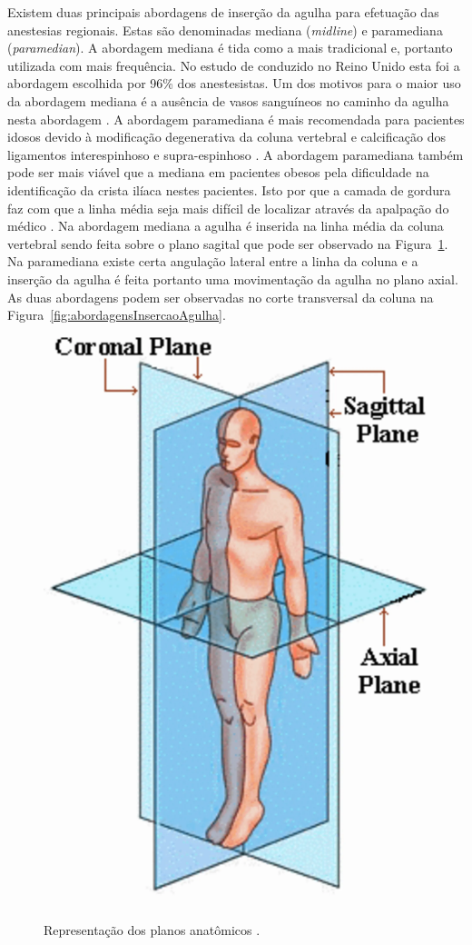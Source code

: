 Existem duas principais abordagens de inserção da agulha para efetuação das anestesias regionais. Estas são denominadas mediana (\textit{midline}) e paramediana (\textit{paramedian}). A abordagem mediana é tida como a mais tradicional e, portanto  utilizada com mais frequência. No estudo de \textcite{Wantman2006} conduzido no Reino Unido esta foi a abordagem escolhida por 96\% dos anestesistas. Um dos motivos para o maior uso da abordagem mediana é a ausência de vasos sanguíneos no caminho da agulha nesta abordagem \cite{Bapat2015}. A abordagem paramediana é mais recomendada para pacientes idosos \cite{Ahsan-ul-Haq2005} devido à modificação degenerativa da coluna vertebral \cite{Boon2003} e calcificação dos ligamentos interespinhoso e supra-espinhoso \cite{Wantman2006}. A abordagem paramediana também pode ser mais viável que a mediana em pacientes obesos pela dificuldade na identificação da crista ilíaca nestes pacientes. Isto por que a camada de gordura faz com que a linha média seja mais difícil de localizar através da apalpação do médico \cite{N.2013}. Na abordagem mediana a agulha é inserida na linha média da coluna vertebral sendo feita sobre o plano sagital que pode ser observado na Figura~\ref{fig:planosAnatomicos}. Na paramediana existe certa angulação lateral entre a linha da coluna e a inserção da agulha é feita portanto uma movimentação da agulha no plano axial. As duas abordagens podem ser observadas no corte transversal da coluna na Figura~\ref{fig:abordagensInsercaoAgulha}. 

\begin{figure}[ht!]
    \centering
    \includegraphics[width=0.35\linewidth]{capitulos/figuras/anatomical-planes.png}
    \caption{Representação dos planos anatômicos \cite{Bridwell2019}.}
    \label{fig:planosAnatomicos}
\end{figure}

